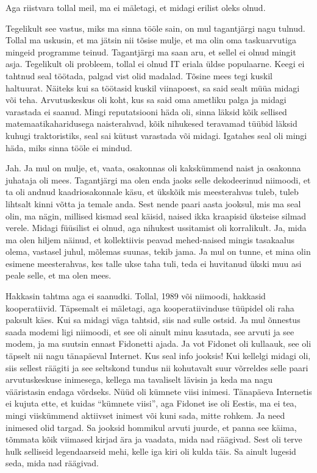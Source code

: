 Aga riistvara tollal meil, ma ei mäletagi, et midagi erilist oleks olnud.


Tegelikult see vastus, miks ma sinna tööle sain, on mul tagantjärgi nagu 
tulnud. Tollal ma uskusin, et ma jätsin nii tõsise mulje, et ma olin oma 
taskuarvutiga mingeid programme teinud. Tagantjärgi ma saan aru, et sellel ei 
olnud mingit asja. Tegelikult oli probleem, tollal ei olnud IT eriala üldse 
populaarne. Keegi ei tahtnud seal töötada, palgad vist olid madalad. Tõsine 
mees tegi kuskil haltuurat. Näiteks kui sa töötasid kuskil viinapoest, sa said 
sealt müüa midagi või teha. Arvutuskeskus oli koht, kus sa said oma ametliku 
palga ja midagi varastada ei saanud. Mingi reputatsiooni häda oli, sinna läksid 
kõik sellised matemaatikaharidusega naisterahvad, kõik nihukesed teravamad 
tüübid läksid kuhugi traktoristiks, seal sai kütust varastada või midagi. 
Igatahes seal oli mingi häda, miks sinna tööle ei mindud. 


Jah. Ja mul on mulje, et, vaata, osakonnas oli kakskümmend naist ja osakonna 
juhataja oli mees. Tagantjärgi ma olen enda jaoks selle dekodeerinud niimoodi, 
et ta oli andnud kaadriosakonnale käsu, et ükskõik mis meesterahvas tuleb, 
tuleb lihtsalt kinni võtta ja temale anda. Sest nende paari aasta jooksul, mis 
ma seal olin, ma nägin, millised kismad seal käisid, naised ikka kraapisid 
üksteise silmad verele. Midagi füüsilist ei olnud, aga  nihukest ussitamist oli 
korralikult. Ja, mida ma olen hiljem näinud, et kollektiivis peavad 
mehed-naised mingis tasakaalus olema, vastasel juhul, mõlemas suunas, tekib 
jama. Ja mul on tunne, et mina olin esimene meesterahvas, kes talle ukse taha 
tuli, teda ei huvitanud ükski muu asi peale selle, et ma olen mees.  


Hakkasin tahtma aga ei saanudki. Tollal, 1989 või niimoodi, hakkasid 
kooperatiivid. Täpsemalt ei mäletagi, aga  kooperatiivinduse tüüpidel oli raha 
paksult käes. Kui sa  midagi väga tahtsid, siis nad sulle ostsid. Ja mul 
õnnestus saada modemi ligi niimoodi, et see oli ainult minu kasutada, see 
arvuti ja see modem, ja ma suutsin ennast Fidonetti ajada. Ja vot Fidonet oli 
kullaauk, see oli täpselt nii nagu tänapäeval Internet. Kus seal info jooksis! 
Kui kellelgi midagi oli, siis sellest räägiti ja see seltskond tundus nii 
kohutavalt suur võrreldes selle paari arvutuskeskuse inimesega, kellega ma 
tavaliselt lävisin ja keda ma nagu  vääristasin endaga võrdseks. Nüüd oli 
kümnete viisi inimesi. Tänapäeva Internetis ei kujuta ette, et kuidas 
\enquote{kümnete viisi},  aga Fidonet ise oli Eestis, ma ei tea, mingi 
viiskümmend aktiivset inimest või kuni sada, mitte rohkem. Ja need inimesed 
olid targad. Sa jooksid hommikul arvuti juurde, et panna see käima, tõmmata 
kõik viimased kirjad ära ja vaadata, mida nad räägivad. Sest oli terve hulk 
selliseid legendaarseid mehi, kelle iga kiri oli kulda täis. Sa ainult lugesid 
seda, mida nad räägivad. 

